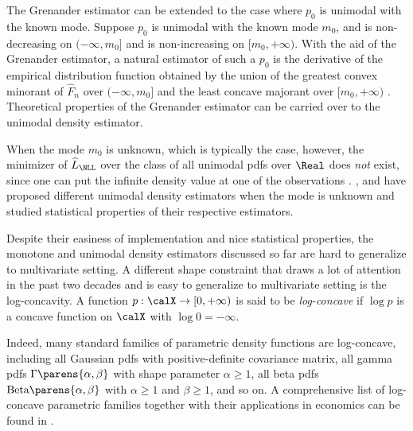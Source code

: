 \documentclass[12pt]{article}
\theoremstyle{definition}
\theoremstyle{theorem}
\theoremstyle{remark}
\begin{document}
The Grenander estimator can be extended to the case where $p_0$ is unimodal with the known mode. Suppose $p_0$ is unimodal with the known mode $m_0$, and is non-decreasing on $(-\infty, m_0]$ and is non-increasing on $[m_0, +\infty)$. With the aid of the Grenander estimator, a natural estimator of such a $p_0$ is the derivative of the empirical distribution function obtained by the union of the greatest convex minorant of $\widehat{F}_n$ over $(-\infty, m_0]$ and the least concave majorant over $[m_0, +\infty)$ \parencite{Birge1997-af}. Theoretical properties of the Grenander estimator can be carried over to the unimodal density estimator. 

When the mode $m_0$ is unknown, which is typically the case, however, the minimizer of $\widehat{L}_{\NLL}$ over the class of all unimodal pdfs over $\Real$ does \emph{not} exist, since one can put the infinite density value at one of the observations \parencite{Birge1997-af}. \textcite{Wegman1970-wm}, \textcite{Wegman1970-ow} and \textcite{Birge1997-af} have proposed different unimodal density estimators when the mode is unknown and studied statistical properties of their respective estimators. 

Despite their easiness of implementation and nice statistical properties, the monotone and unimodal density estimators discussed so far are hard to generalize to multivariate setting. A different shape constraint that draws a lot of attention in the past two decades and is easy to generalize to multivariate setting is the log-concavity. A function $p: \calX \to [0, +\infty)$ is said to be \emph{log-concave} if $\log p$ is a concave function on $\calX$ with $\log 0 = - \infty$. 


Indeed, many standard families of parametric density functions are log-concave, including all Gaussian pdfs with positive-definite covariance matrix, all gamma pdfs $\Gamma \parens{\alpha, \beta}$ with shape parameter $\alpha \ge 1$, all beta pdfs $\text{Beta} \parens{\alpha, \beta}$ with $\alpha \ge 1$ and $\beta \ge 1$, and so on. A comprehensive list of log-concave parametric families together with their applications in economics can be found in \textcite{Bagnoli2005}. 
\end{document}
